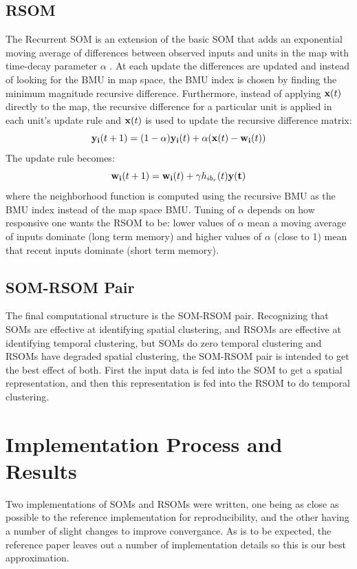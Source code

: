 \documentclass[a4paper,10pt]{article}
\begin{document}
\subsection{RSOM}
The Recurrent SOM is an extension of the basic SOM that adds an exponential moving average of
differences between observed inputs and units in the map with time-decay parameter $\alpha$ . At
each update the differences are updated and instead of looking for the BMU in map space, the BMU
index is chosen by finding the minimum magnitude recursive difference. Furthermore, instead of
applying $\bold{x}(t)$ directly to the map, the recursive difference for a particular unit is
applied in each unit's update rule and $\bold{x}(t)$ is used to update the recursive difference
matrix:
\begin{equation}
 \bold{y_i}(t+1) = (1-\alpha)\bold{y_i}(t)+\alpha(\bold{x}(t)-\bold{w_i}(t))
\end{equation}
The update rule becomes:
 \begin{equation} \label{eq:RUPDATE}
 \bold{w_{i}}(t+1) = \bold{w_i}(t) + \gamma h_{ib_r}(t)\bold{y(t)}
\end{equation}
where the neighborhood function is computed using the recursive BMU as the BMU index instead of the
map space BMU.  Tuning of $\alpha$ depends on how responsive one wants the RSOM to be: lower values
of $\alpha$ mean a moving average of inputs dominate (long term memory) and higher values of
$\alpha$ (close to 1) mean that recent inputs dominate (short term memory).
\subsection{SOM-RSOM Pair}
The final computational structure is the SOM-RSOM pair.  Recognizing that SOMs are effective at
identifying spatial clustering, and RSOMs are effective at identifying temporal clustering, but
SOMs do zero temporal clustering and RSOMs have degraded spatial clustering, the SOM-RSOM pair is
intended to get the best effect of both.  First the input data is fed into the SOM to get a spatial
representation, and then this representation is fed into the RSOM to do temporal clustering. 
\section{Implementation Process and Results}
Two implementations of SOMs and RSOMs were written, one being as close as possible
to the reference implementation for reproducibility, and the other having a number of slight
changes to improve convergance.  As is to be expected, the reference paper leaves out a
number of implementation details so this is our best approximation.
\end{document}
